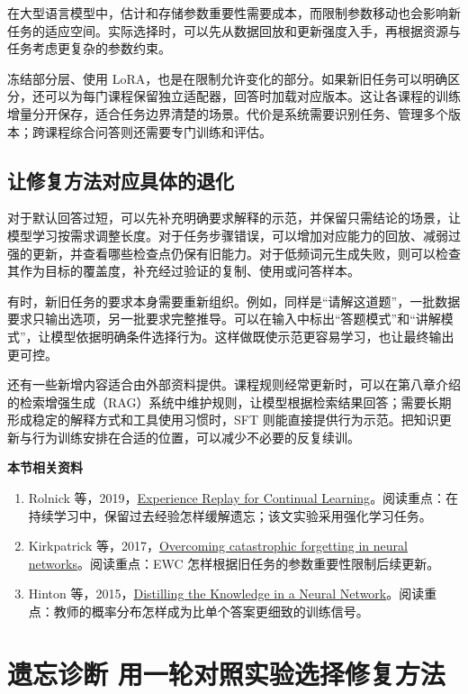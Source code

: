在大型语言模型中，估计和存储参数重要性需要成本，而限制参数移动也会影响新任务的适应空间。实际选择时，可以先从数据回放和更新强度入手，再根据资源与任务考虑更复杂的参数约束。

冻结部分层、使用 LoRA，也是在限制允许变化的部分。如果新旧任务可以明确区分，还可以为每门课程保留独立适配器，回答时加载对应版本。这让各课程的训练增量分开保存，适合任务边界清楚的场景。代价是系统需要识别任务、管理多个版本；跨课程综合问答则还需要专门训练和评估。

\subsection{让修复方法对应具体的退化}

对于默认回答过短，可以先补充明确要求解释的示范，并保留只需结论的场景，让模型学习按需求调整长度。对于任务步骤错误，可以增加对应能力的回放、减弱过强的更新，并查看哪些检查点仍保有旧能力。对于低频词元生成失败，则可以检查其作为目标的覆盖度，补充经过验证的复制、使用或问答样本。

有时，新旧任务的要求本身需要重新组织。例如，同样是“请解这道题”，一批数据要求只输出选项，另一批要求完整推导。可以在输入中标出“答题模式”和“讲解模式”，让模型依据明确条件选择行为。这样做既使示范更容易学习，也让最终输出更可控。

还有一些新增内容适合由外部资料提供。课程规则经常更新时，可以在第八章介绍的检索增强生成（RAG）系统中维护规则，让模型根据检索结果回答；需要长期形成稳定的解释方式和工具使用习惯时，SFT 则能直接提供行为示范。把知识更新与行为训练安排在合适的位置，可以减少不必要的反复续训。

\textbf{本节相关资料}
\begin{enumerate}
    \item Rolnick 等，2019，\href{https://arxiv.org/abs/1811.11682}{Experience Replay for Continual Learning}。阅读重点：在持续学习中，保留过去经验怎样缓解遗忘；该文实验采用强化学习任务。
    \item Kirkpatrick 等，2017，\href{https://arxiv.org/abs/1612.00796}{Overcoming catastrophic forgetting in neural networks}。阅读重点：EWC 怎样根据旧任务的参数重要性限制后续更新。
    \item Hinton 等，2015，\href{https://arxiv.org/abs/1503.02531}{Distilling the Knowledge in a Neural Network}。阅读重点：教师的概率分布怎样成为比单个答案更细致的训练信号。
\end{enumerate}

\section{遗忘诊断 用一轮对照实验选择修复方法}\label{遗忘诊断 用对照实验选择修复方法}

